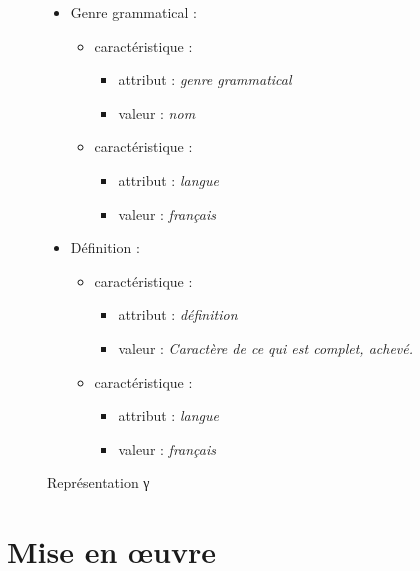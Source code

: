 \documentclass[10pt]{report}
\newcommand{\entité}[1]{\textcolor{blue!60!black}{#1}}
\newcommand{\caractéristique}[1]{\textcolor{green!60!black}{#1}}
\newcommand{\entitétechnique}[1]{\textcolor{blue!50!red}{#1}}
\begin{document}
\begin{figure}[h]
\begin{minipage}{0.5\linewidth}
\begin{itemize}
\begin{itemize}
\begin{itemize}
        \end{itemize}
        \item \entité{Genre grammatical} :
        \begin{itemize}
        	\item \entité{caractéristique} :
        	\begin{itemize}
            \item \caractéristique{attribut} : \textit{genre grammatical}
            \item \caractéristique{valeur} : \textit{nom}
        	\end{itemize}
        	\item \entité{caractéristique} :
        	\begin{itemize}
            \item \caractéristique{attribut} : \textit{langue}
            \item \caractéristique{valeur} : \textit{français}
        	\end{itemize}
        \end{itemize}
        \item \entité{Définition} :
                \begin{itemize}
        	\item \entité{caractéristique} :
        	\begin{itemize}
            \item \caractéristique{attribut} : \textit{définition}
            \item \caractéristique{valeur} : \textit{Caractère de ce qui est complet, achevé.}
        	\end{itemize}
        	\item \entité{caractéristique} :
        	\begin{itemize}
            \item \caractéristique{attribut} : \textit{langue}
            \item \caractéristique{valeur} : \textit{français}
        	\end{itemize}
        \end{itemize}
    	\end{itemize}
    \end{itemize}
	\end{minipage}
	\caption{Représentation γ}
	\label{rep-γ}
\end{figure}

\chapter{Mise en œuvre}
\end{document}

